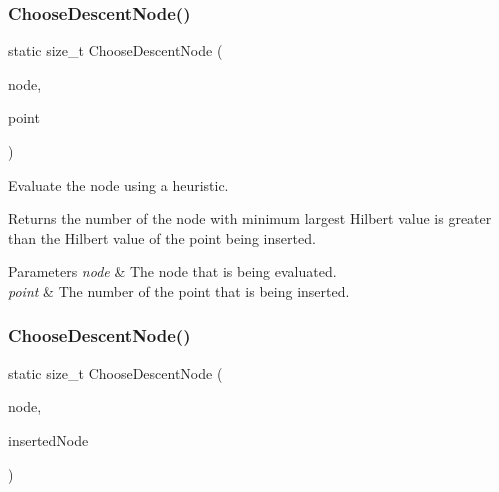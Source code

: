 \subsubsection{Choose\+Descent\+Node()\hspace{0.1cm}{\footnotesize\ttfamily [1/2]}}
{\footnotesize\ttfamily static size\+\_\+t Choose\+Descent\+Node (\begin{DoxyParamCaption}\item[{Tree\+Type $\ast$}]{node,  }\item[{const size\+\_\+t}]{point }\end{DoxyParamCaption})\hspace{0.3cm}{\ttfamily [static]}}



Evaluate the node using a heuristic. 

Returns the number of the node with minimum largest Hilbert value is greater than the Hilbert value of the point being inserted.


\begin{DoxyParams}{Parameters}
{\em node} & The node that is being evaluated. \\
\hline
{\em point} & The number of the point that is being inserted. \\
\hline
\end{DoxyParams}
\mbox{\label{classmlpack_1_1tree_1_1RPlusPlusTreeDescentHeuristic_aa91503da5ab453e1a2e13cde6deded48}} 
\subsubsection{Choose\+Descent\+Node()\hspace{0.1cm}{\footnotesize\ttfamily [2/2]}}
{\footnotesize\ttfamily static size\+\_\+t Choose\+Descent\+Node (\begin{DoxyParamCaption}\item[{const Tree\+Type $\ast$}]{node,  }\item[{const Tree\+Type $\ast$}]{inserted\+Node }\end{DoxyParamCaption})\hspace{0.3cm}{\ttfamily [static]}}



